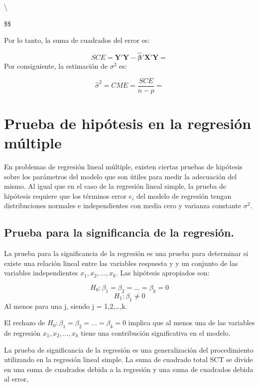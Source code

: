 \documentclass[
]{book}
\begin{document}
\textbackslash{}

\$\$

Por lo tanto, la suma de cuadrados del error es:

\[
SCE = \boldsymbol{Y'Y - \hat{\beta}'X'Y}=
\] Por consiguiente, la estimación de \(\sigma^{2}\) es:

\[
\hat{\sigma}^{2}=CME=\frac{SCE}{n-p}=
\]

\hypertarget{prueba-de-hipuxf3tesis-en-la-regresiuxf3n-muxfaltiple}{%
\section{Prueba de hipótesis en la regresión múltiple}\label{prueba-de-hipuxf3tesis-en-la-regresiuxf3n-muxfaltiple}}

En problemas de regresión lineal múltiple, existen ciertas pruebas de hipótesis sobre los parámetros del modelo que son útiles para medir la adecuación del mismo. Al igual que en el caso de la regresión lineal simple, la prueba de hipótesis requiere que los términos error \(e_{i}\) del modelo de regresión tengan distribuciones normales e independientes con media cero y varianza constante \(\sigma^{2}\).

\hypertarget{prueba-para-la-significancia-de-la-regresiuxf3n.}{%
\subsection{Prueba para la significancia de la regresión.}\label{prueba-para-la-significancia-de-la-regresiuxf3n.}}

La prueba para la significancia de la regresión es una prueba para determinar si existe una relación lineal entre las variables respuesta y y un conjunto de las variables independientes \(x_{1},x_{2},...,x_{k}\). Las hipótesis apropiados son:

\[
\begin{equation}
H_{0}:\beta_{1}=\beta_{2}=...=\beta_{k}=0
\end{equation}
\label{eq:hipotesis-nula}
\] \[
\begin{equation}
H_{1}:\beta_{1}≠0
\label{eq:hipotesis-alternativa}
\end{equation}
\] Al menos para una j, siendo j = 1,2,\ldots,k.

El rechazo de \(H_{0}:\beta_{1}=\beta_{2}=...=\beta_{k}=0\) implica que al menos una de las variables de regresión \(x_{1},x_{2},...,x_{k}\) tiene una contribución significativa en el modelo.

La prueba de significancia de la regresión es una generalización del procedimiento utilizando en la regresión lineal simple. La suma de cuadrado total SCT se divide en una suma de cuadrados debida a la regresión y una suma de cuadrados debida al error,
\end{document}
